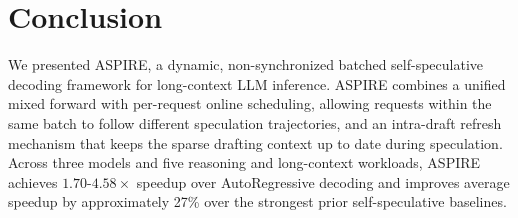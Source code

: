 \section{Conclusion}
We presented ASPIRE, a dynamic, non-synchronized batched self-speculative decoding framework for long-context LLM inference. ASPIRE combines a unified mixed forward with per-request online scheduling, allowing requests within the same batch to follow different speculation trajectories, and an intra-draft refresh mechanism that keeps the sparse drafting context up to date during speculation. Across three models and five reasoning and long-context workloads, ASPIRE achieves $1.70$-$4.58\times$ speedup over AutoRegressive decoding and improves average speedup by approximately 27\% over the strongest prior self-speculative baselines.
